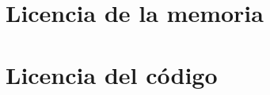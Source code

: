 \documentclass[a4paper]{book}
\begin{document}
\newpage{\pagestyle{empty}\cleardoublepage}


\newpage{\pagestyle{empty}\cleardoublepage}


\setcounter{tocdepth}{3}
\setcounter{secnumdepth}{3}

\tableofcontents %
\newpage
\listoffigures %
\listoftables

\mainmatter









\appendix
\chapter{Licencia de la memoria}
\label{app:docLicense}


\chapter{Licencia del código}

\end{document}
